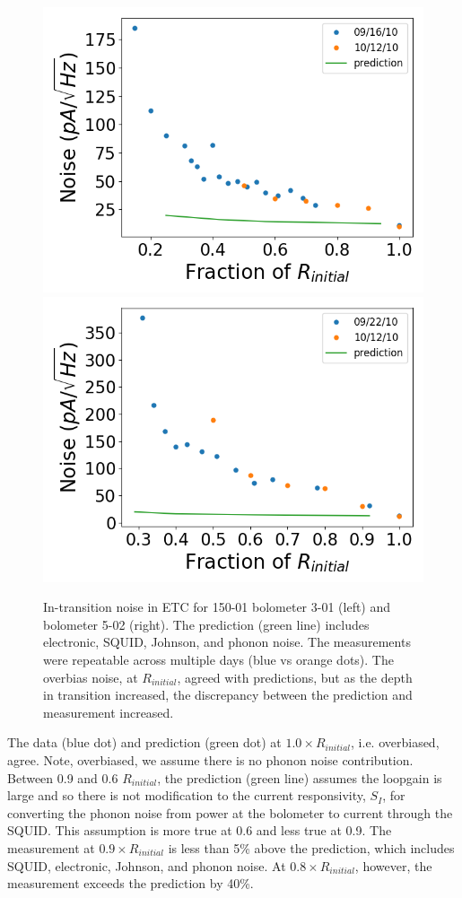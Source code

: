 \begin{figure}[ht!]
\begin{center}
\includegraphics[width=0.48\columnwidth]{figures/b54w2c0_it_noise.png}
\includegraphics[width=0.48\columnwidth]{figures/b54w2c3_it_noise.png}
\caption{In-transition noise in \ac{ETC} for 150-01 bolometer 3-01 (left) and bolometer 5-02 (right). The prediction (green line) includes electronic, \ac{SQUID}, Johnson, and phonon noise. The measurements were repeatable across multiple days (blue vs orange dots). The overbias noise, at $R_{initial}$, agreed with predictions, but as the depth in transition increased, the discrepancy between the prediction and measurement increased. 
\label{fig:etc_it_noise} }
\end{center}
\end{figure}

The data (blue dot) and prediction (green dot) at $1.0 \times R_{initial}$, i.e. overbiased, agree. 
Note, overbiased, we assume there is no phonon noise contribution. 
Between 0.9 and 0.6 $R_{initial}$, the prediction (green line) assumes the loopgain is large and so there is not modification to the current responsivity, $S_{I}$, for converting the phonon noise from power at the bolometer to current through the \ac{SQUID}.
This assumption is more true at 0.6 and less true at 0.9. 
The measurement at $0.9 \times R_{initial}$ is less than 5\% above the prediction, which includes \ac{SQUID}, electronic, Johnson, and phonon noise. 
At $0.8 \times R_{initial}$, however, the measurement exceeds the prediction by 40\%. 


